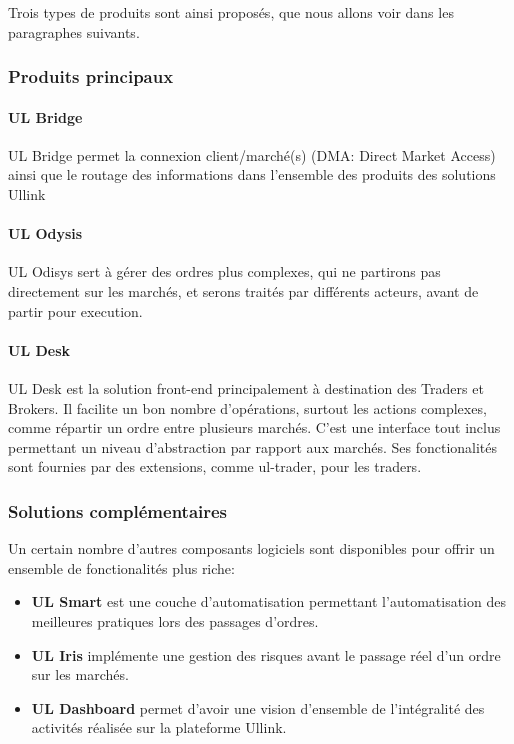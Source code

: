 \documentclass[a4paper, 12pt]{article}
\begin{document}
Trois types de produits sont ainsi proposés, que nous allons voir dans les paragraphes suivants.

\subsubsection{Produits principaux}

\paragraph{UL Bridge}

UL Bridge permet la connexion client/marché(s) (DMA: Direct Market Access) ainsi que le routage des informations dans l'ensemble des produits des solutions Ullink

\paragraph{UL Odysis}

UL Odisys sert à gérer des ordres plus complexes, qui ne partirons pas directement sur les marchés, et serons traités par différents acteurs, avant de partir pour execution.

\paragraph{UL Desk}
UL Desk est la solution front-end principalement à destination des Traders et Brokers. Il facilite un bon nombre d'opérations, surtout les actions complexes, comme répartir un ordre entre plusieurs marchés. C'est une interface tout inclus permettant un niveau d'abstraction par rapport aux marchés. Ses fonctionalités sont fournies par des extensions, comme ul-trader, pour les traders.

\subsubsection{Solutions complémentaires}
Un certain nombre d'autres composants logiciels sont disponibles pour offrir un ensemble de fonctionalités plus riche:

\begin{itemize}
\item{{\bf UL Smart} est une couche d'automatisation permettant l'automatisation des meilleures pratiques lors des passages d'ordres.}
\item{{\bf UL Iris} implémente une gestion des risques avant le passage réel d'un ordre sur les marchés.}
\item{{\bf UL Dashboard} permet d'avoir une vision d'ensemble de l'intégralité des activités réalisée sur la plateforme Ullink.}
\end{itemize}
\end{document}
